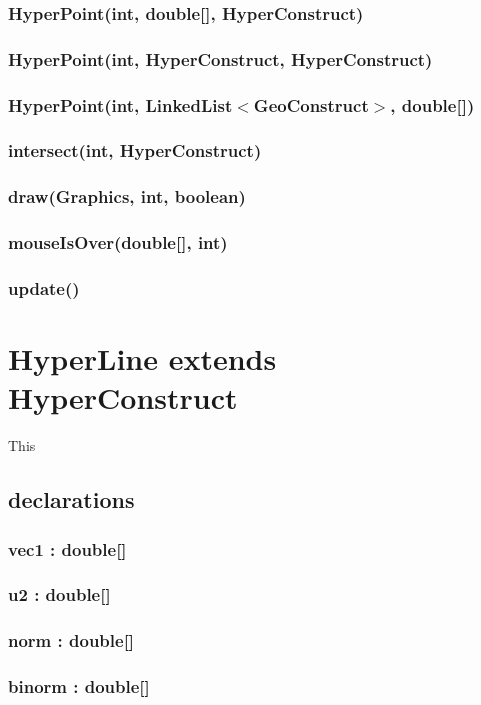 \documentclass[a4paper,10pt]{report}
\begin{document}
\subsubsection{HyperPoint(int, double[], HyperConstruct)}
\subsubsection{HyperPoint(int, HyperConstruct, HyperConstruct)}
\subsubsection{HyperPoint(int, LinkedList$<$GeoConstruct$>$, double[])}
\subsubsection{intersect(int, HyperConstruct)}
\subsubsection{draw(Graphics, int, boolean)}
\subsubsection{mouseIsOver(double[], int)}
\subsubsection{update()}
\section{HyperLine  extends HyperConstruct} This
\subsection{declarations}
\subsubsection{vec1 : double[]}
\subsubsection{u2 : double[]}
\subsubsection{norm : double[]}
\subsubsection{binorm : double[]}
\end{document}

